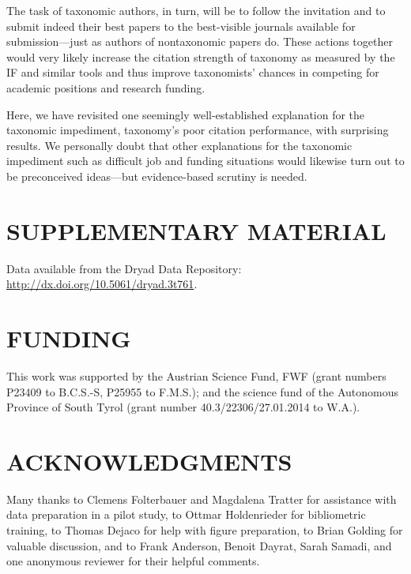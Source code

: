 \documentclass[webpdf,PV,mynatbib,surname,CE,MSC]{SYS-PV}
\begin{document}
The task of taxonomic authors, in turn, will be to follow the invitation and to submit indeed
their best papers to the best-visible journals available for submission---just as authors of
nontaxonomic papers do. These actions together would very likely increase the citation strength of
taxonomy as measured by the IF and similar tools and thus improve taxonomists' chances in
competing for academic positions and research funding.

Here, we have revisited one seemingly well-established explanation for the taxonomic impediment,
taxonomy's poor citation performance, with surprising results. We personally doubt that other
explanations for the taxonomic impediment such as difficult job and funding situations would
likewise turn out to be preconceived ideas---but evidence-based scrutiny is needed.


\section*{S{\sc UPPLEMENTARY} M{\sc ATERIAL}}

Data available from the Dryad Data Repository:
\href{http://dx.doi.org/10.5061/dryad.3t761}{http://dx.doi.org/10.5061/dryad.3t761}.

\section*{F{\sc UNDING}}

This work was supported by the Austrian Science Fund, FWF (grant numbers P23409 to B.C.S.-S,
P25955 to F.M.S.); and the science fund of the Autonomous Province of South Tyrol (grant number
40.3/22306/27.01.2014 to W.A.).

\section*{A{\sc CKNOWLEDGMENTS}}

Many thanks to Clemens Folterbauer and Magdalena Tratter for assistance with data preparation in a
pilot study, to Ottmar Holdenrieder for bibliometric training, to Thomas Dejaco for help with
figure preparation, to Brian Golding for valuable discussion, and to Frank Anderson, Benoit
Dayrat, Sarah Samadi, and one anonymous reviewer for their helpful comments.
\end{document}
